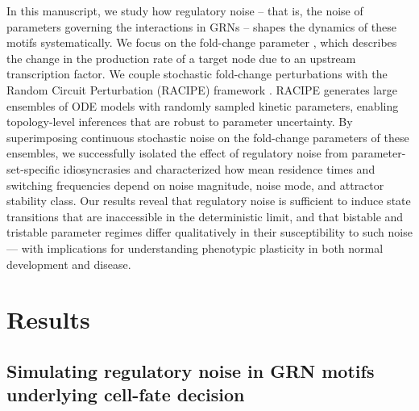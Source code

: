 \documentclass[11pt]{article}
\begin{document}
In this manuscript, we study how regulatory noise – that is, the noise of parameters governing the interactions in GRNs – shapes the dynamics of these motifs systematically. We focus on the fold-change parameter \cite{Huang2017}, which describes the change in the production rate of a target node due to an upstream transcription factor. We couple stochastic fold-change perturbations with the Random Circuit Perturbation (RACIPE) framework \cite{Huang2017}. RACIPE generates large ensembles of ODE models with randomly sampled kinetic parameters, enabling topology-level inferences that are robust to parameter uncertainty. By superimposing continuous stochastic noise on the fold-change parameters of these ensembles, we successfully isolated the effect of regulatory noise from parameter-set-specific idiosyncrasies and characterized how mean residence times and switching frequencies depend on noise magnitude, noise mode, and attractor stability class. Our results reveal that regulatory noise is sufficient to induce state transitions that are inaccessible in the deterministic limit, and that bistable and tristable parameter regimes differ qualitatively in their susceptibility to such noise — with implications for understanding phenotypic plasticity in both normal development and disease.

\section{Results}

\subsection{Simulating regulatory noise in GRN motifs underlying cell-fate decision}
\end{document}
